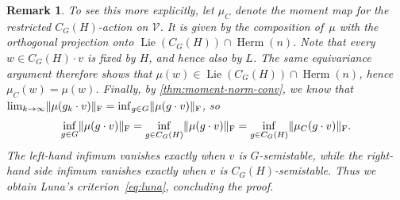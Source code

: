 \documentclass[11pt,letterpaper]{article}
\newtheorem{remark}[theorem]{Remark}\AddToHook{env/remark/begin}{\crefalias{theorem}{remark}}
\numberwithin{equation}{section}
\newcommand{\VV}{\mathcal{V}}
\DeclareMathOperator{\Lie}{Lie}
\DeclareMathOperator{\Herm}{Herm}
\DeclarePairedDelimiter\norm{\lVert}{\rVert}
\begin{document}
\begin{remark}
To see this more explicitly, let $\mu_C$ denote the moment map for the restricted $C_G(H)$-action on $\VV$.
It is given by the composition of~$\mu$ with the orthogonal projection onto $\Lie(C_G(H))\cap \Herm(n)$.
Note that every $w\in C_G(H)\cdot v$ is fixed by $H$, and hence also by $L$.
The same equivariance argument therefore shows that $\mu(w) \in \Lie(C_G(H))\cap \Herm(n)$, hence $\mu_C(w)=\mu(w)$.
Finally, by \cref{thm:moment-norm-conv}, we know that~$\lim_{k\rightarrow\infty} \norm{\mu(g_k\cdot v)}_{\mathrm{F}}=\inf_{g\in G}\norm{\mu(g\cdot v)}_{\mathrm{F}}$, so
\[
    \inf_{g\in G}\norm{\mu(g\cdot v)}_{\mathrm{F}}
= \inf_{g\in C_G(H)}\norm{\mu(g\cdot v)}_{\mathrm{F}}
= \inf_{g\in C_G(H)}\norm{\mu_C(g\cdot v)}_{\mathrm{F}}.
\]
The left-hand infimum vanishes exactly when $v$ is $G$-semistable, while the right-hand side infimum vanishes exactly when $v$ is $C_G(H)$-semistable.
Thus we obtain Luna's criterion~\eqref{eq:luna}, concluding the proof.
\end{remark}


\end{document}
